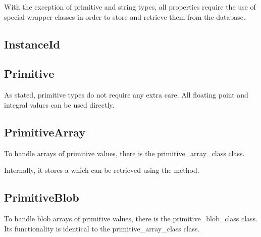 With the exception of primitive and string types, all properties require the use of special wrapper classes in order to store and retrieve them from the database.

\subsection{InstanceId}
\label{section:member_types:instance_id}

\subsection{Primitive}
\label{section:member_types:primitive}

As stated, primitive types do not require any extra care. All floating point and integral values can be used directly.





\subsection{PrimitiveArray}
\label{section:member_types:primitive_array}

To handle arrays of primitive values, there is the \gls{primitive_array_class} class.



Internally, it stores a  which can be retrieved using the  method.



\subsection{PrimitiveBlob}
\label{section:member_types:primitive_blob}

To handle blob arrays of primitive values, there is the \gls{primitive_blob_class} class. Its functionality is identical to the \gls{primitive_array_class} class.





